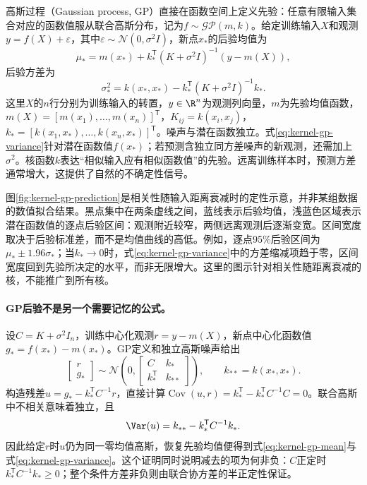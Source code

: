 高斯过程（Gaussian process, GP）直接在函数空间上定义先验：任意有限输入集合对应的函数值服从联合高斯分布，记为$f\sim\mathcal{GP}(m,k)$。给定训练输入$X$和观测$y=f(X)+\varepsilon$，其中$\varepsilon\sim\mathcal{N}(0,\sigma^2I)$，新点$x_*$的后验均值为
\begin{equation}
 \mu_* = m(x_*)+k_*^{\mathsf T}(K+\sigma^2I)^{-1}(y-m(X)),\label{eq:kernel-gp-mean}
\end{equation}
后验方差为
\begin{equation}
 \sigma_*^2=k(x_*,x_*)-k_*^{\mathsf T}(K+\sigma^2I)^{-1}k_*.\label{eq:kernel-gp-variance}
\end{equation}
这里$X$的$n$行分别为训练输入的转置，$y\in\R^n$为观测列向量，$m$为先验均值函数，$m(X)=[m(x_1),\ldots,m(x_n)]^{\mathsf T}$，$K_{ij}=k(x_i,x_j)$，$k_*=[k(x_1,x_*),\ldots,k(x_n,x_*)]^{\mathsf T}$。噪声与潜在函数独立。式\eqref{eq:kernel-gp-variance}针对潜在函数值$f(x_*)$；若预测含独立同方差噪声的新观测，还需加上$\sigma^2$。核函数$k$表达“相似输入应有相似函数值”的先验。远离训练样本时，预测方差通常增大，这提供了自然的不确定性信号。

图\ref{fig:kernel-gp-prediction}是相关性随输入距离衰减时的定性示意，并非某组数据的数值拟合结果。黑点集中在两条虚线之间，蓝线表示后验均值，浅蓝色区域表示潜在函数值的逐点后验区间：观测附近较窄，两侧远离观测后逐渐变宽。区间宽度取决于后验标准差，而不是均值曲线的高低。例如，逐点95\%后验区间为$\mu_*\pm1.96\sigma_*$；当$k_*\to0$时，式\eqref{eq:kernel-gp-variance}中的方差缩减项趋于零，区间宽度回到先验所决定的水平，而非无限增大。这里的图示针对相关性随距离衰减的核，不能推广到所有核。
\paragraph{GP后验不是另一个需要记忆的公式。}
设$C=K+\sigma^2I_n$，训练中心化观测$r=y-m(X)$，新点中心化函数值$g_*=f(x_*)-m(x_*)$。GP定义和独立高斯噪声给出
\begin{equation}
 \begin{bmatrix}r\\g_*\end{bmatrix}\sim\mathcal N\left(0,
 \begin{bmatrix}C&k_*\\k_*^{\mathsf T}&k_{**}\end{bmatrix}\right),
 \qquad k_{**}=k(x_*,x_*).
\end{equation}
构造残差$u=g_*-k_*^{\mathsf T}C^{-1}r$，直接计算$\operatorname{Cov}(u,r)=k_*^{\mathsf T}-k_*^{\mathsf T}C^{-1}C=0$。联合高斯中不相关意味着独立，且
\begin{equation}
 \Var(u)=k_{**}-k_*^{\mathsf T}C^{-1}k_*.
\end{equation}
因此给定$r$时$u$仍为同一零均值高斯，恢复先验均值便得到式\eqref{eq:kernel-gp-mean}与式\eqref{eq:kernel-gp-variance}。这个证明同时说明减去的项为何非负：$C$正定时$k_*^{\mathsf T}C^{-1}k_*\geq0$；整个条件方差非负则由联合协方差的半正定性保证。

